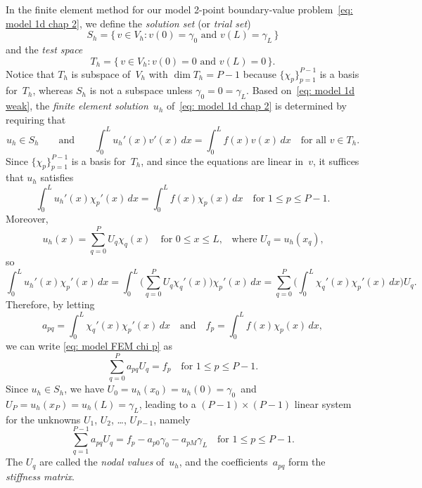 In the finite element method for our model 2-point boundary-value 
problem~\eqref{eq: model 1d chap 2}, we define the \emph{solution set} (or
\emph{trial set})
\begin{equation}\label{eq: Sh 1D}
S_h=\{\,v\in V_h:\text{$v(0)=\gamma_0$ and $v(L)=\gamma_L$}\,\}
\end{equation}
and the \emph{test space}
\[
T_h=\{\,v\in V_h:\text{$v(0)=0$ and $v(L)=0$}\,\}.
\]
Notice that $T_h$ is subspace of~$V_h$ with $\dim T_h=P-1$ because 
$\{\chi_p\}_{p=1}^{P-1}$ is a basis for~$T_h$, whereas $S_h$ is 
not a subspace unless $\gamma_0=0=\gamma_L$.  Based 
on~\eqref{eq: model 1d weak}, the \emph{finite element solution}~$u_h$
of~\eqref{eq: model 1d chap 2} is determined by requiring that
\[
u_h\in S_h\qquad\text{and}\qquad
\int_0^L u_h'(x)v'(x)\,dx=\int_0^L f(x)v(x)\,dx \quad\text{for all $v\in T_h$.}
\]
Since $\{\chi_p\}_{p=1}^{P-1}$ is a basis for~$T_h$, and since the equations 
are linear in~$v$, it suffices that $u_h$ satisfies
\begin{equation}\label{eq: model FEM chi p}
\int_0^L u_h'(x)\chi_p'(x)\,dx=\int_0^L f(x)\chi_p(x)\,dx 
    \quad\text{for $1\le p\le P-1$.}
\end{equation}
Moreover, 
\begin{equation}\label{eq: uh U 1d}
u_h(x)=\sum_{q=0}^P U_q\chi_q(x)\quad\text{for $0\le x\le L$,}\quad
\text{where $U_q=u_h(x_q)$,}
\end{equation}
so
\[
\int_0^Lu_h'(x)\chi_p'(x)\,dx
    =\int_0^L\biggl(\sum_{q=0}^PU_q\chi_q'(x)\biggr)\chi_p'(x)\,dx
    =\sum_{q=0}^P\biggl(\int_0^L\chi_q'(x)\chi_p'(x)\,dx\biggr)U_q.
\]
Therefore, by letting
\[
a_{pq}=\int_0^L\chi_q'(x)\chi_p'(x)\,dx
\quad\text{and}\quad
f_p=\int_0^Lf(x)\chi_p(x)\,dx,
\]
we can write \eqref{eq: model FEM chi p} as
\[
\sum_{q=0}^P a_{pq}U_q=f_p\quad\text{for $1\le p\le P-1$.}
\]
Since $u_h\in S_h$, we have $U_0=u_h(x_0)=u_h(0)=\gamma_0$~and 
$U_P=u_h(x_P)=u_h(L)=\gamma_L$, leading to a $(P-1)\times(P-1)$ linear system 
for the unknowns $U_1$, $U_2$, \dots, $U_{P-1}$, namely
\begin{equation}\label{eq: model FEM eqns}
\sum_{q=1}^{P-1}a_{pq}U_q=f_p-a_{p0}\gamma_0-a_{pM}\gamma_L
    \quad\text{for $1\le p\le P-1$.}
\end{equation}
The $U_q$ are called the \emph{nodal values} of~$u_h$, and the 
coefficients~$a_{pq}$ form the \emph{stiffness matrix}.

